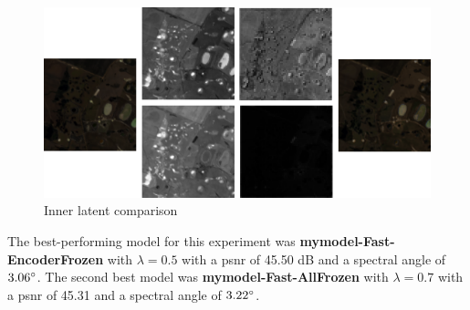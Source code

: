 \begin{figure}
\centering
\includegraphics[scale=0.85]{img/innerlatent.png}
\caption{Inner latent comparison}
\label{fig:innerlatent}
\end{figure}

The best-performing model for this experiment was \textbf{\ac{mymodel}-Fast-EncoderFrozen} with $\lambda=0.5$ with a \ac{psnr} of 45.50 dB and a spectral angle of $3.06 \degree$. The second best model was \textbf{\ac{mymodel}-Fast-AllFrozen} with $\lambda=0.7$ with a \ac{psnr} of 45.31 and a spectral angle of $3.22 \degree$.

